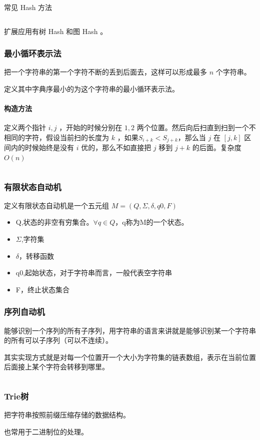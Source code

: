 \documentclass[UTF-8]{ctexart}
\newcommand{\cpp}[1]{\inputminted[bgcolor=bg,breaklines,breakanywhere=true]{c++}{#1}}
\begin{document}
			常见 Hash 方法
			\cpp{code//String//hash.cpp}
			扩展应用有树 Hash 和图 Hash 。
			\subsubsection{最小循环表示法}
			把一个字符串的第一个字符不断的丢到后面去，这样可以形成最多 $n$ 个字符串。
			
			定义其中字典序最小的为这个字符串的最小循环表示法。
			
			\paragraph{构造方法} 定义两个指针 $i,j$ ，开始的时候分别在 $1,2$ 两个位置。然后向后扫直到扫到一个不相同的字符，假设当前扫的长度为 $k$ ，如果$S_{i+k} < S_{j+k}$，那么当 $j$ 在 $[j,k]$ 区间内的时候始终是没有 $i$ 优的，那么不如直接把 $j$ 移到 $j+k$ 的后面。复杂度 $O(n)$
			\cpp{code//String//minre.cpp}
			\subsubsection{有限状态自动机}
			定义有限状态自动机是一个五元组 $M=(Q, \Sigma, \delta, q0, F)$
			
			\begin{itemize}
				\item Q,状态的非空有穷集合。$\forall q \in Q$，q称为M的一个状态。
				\item $\Sigma$,字符集
				\item $\delta$，转移函数
				\item q0,起始状态，对于字符串而言，一般代表空字符串
				\item F，终止状态集合
			\end{itemize}
			
			\subsubsection{序列自动机}
			能够识别一个序列的所有子序列，用字符串的语言来讲就是能够识别某一个字符串的所有可以子序列（可以不连续）。
			
			其实实现方式就是对每一个位置开一个大小为字符集的链表数组，表示在当前位置后面接上某个字符会转移到哪里。
			\cpp{code//String//seqauto.cpp}
			\subsubsection{Trie树}
			把字符串按照前缀压缩存储的数据结构。
	
			也常用于二进制位的处理。
\end{document}

